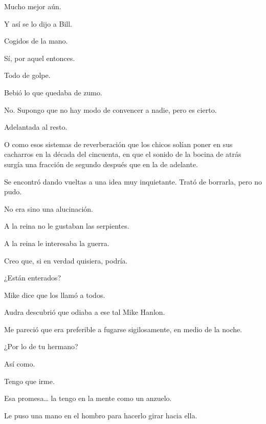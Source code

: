 \sk
Mucho mejor aún. 

\sk
Y así se lo dijo a Bill. 

\sk
Cogidos de la mano.\nb{}

\sk
Sí, por aquel entonces. 

\sk
Todo de golpe. 

\sk
Bebió lo que quedaba de zumo. 

\sk
No. Supongo que no hay modo de convencer a nadie, pero es cierto. 

\sk
Adelantada al resto. 

\sk
O como esos sistemas de
reverberación que los chicos solían poner en sus
cacharros en la década del cincuenta, en que el
sonido de la bocina de atrás surgía una fracción de
segundo después que en la de adelante.
\nb{}

\sk
Se encontró dando vueltas a una idea muy inquietante. Trató de borrarla, pero no pudo. 

\sk
No era sino una alucinación. 

\sk
A la reina no le gustaban las serpientes.\nb{}

\sk
A la reina le interesaba la guerra.\nb{}

\sk
 Creo que, si en verdad quisiera, podría. 

\sk
¿Están enterados? 

\sk
Mike dice que los llamó a todos. 

\sk
Audra descubrió que odiaba a ese tal Mike Hanlon. 

\sk
Me
pareció que era preferible a fugarse sigilosamente, en medio de la noche. 

\sk
¿Por lo de tu hermano? 

\sk
Así como. 

\sk
Tengo que irme. 

\sk
Esa promesa\ldots{} la tengo en la mente como un anzuelo. \nb{}

\sk
Le puso una mano en el hombro para hacerlo girar hacia ella. 

